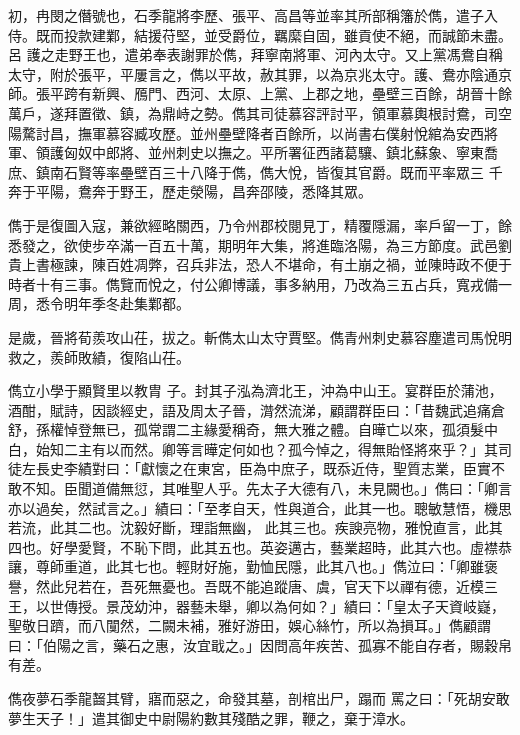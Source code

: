 \begin{pinyinscope}
 初，冉閔之僭號也，石季龍將李歷、張平、高昌等並率其所部稱籓於儁，遣子入侍。既而投款建鄴，結援苻堅，並受爵位，羈縻自固，雖貢使不絕，而誠節未盡。呂
 護之走野王也，遣弟奉表謝罪於儁，拜寧南將軍、河內太守。又上黨馮鴦自稱太守，附於張平，平屢言之，儁以平故，赦其罪，以為京兆太守。護、鴦亦陰通京師。張平跨有新興、鴈門、西河、太原、上黨、上郡之地，壘壁三百餘，胡晉十餘萬戶，遂拜置徵、鎮，為鼎峙之勢。儁其司徒慕容評討平，領軍慕輿根討鴦，司空陽騖討昌，撫軍慕容臧攻歷。並州壘壁降者百餘所，以尚書右僕射悅綰為安西將軍、領護匈奴中郎將、並州刺史以撫之。平所署征西諸葛驤、鎮北蘇象、寧東喬庶、鎮南石賢等率壘壁百三十八降于儁，儁大悅，皆復其官爵。既而平率眾三
 千奔于平陽，鴦奔于野王，歷走滎陽，昌奔邵陵，悉降其眾。



 儁于是復圖入寇，兼欲經略關西，乃令州郡校閱見丁，精覆隱漏，率戶留一丁，餘悉發之，欲使步卒滿一百五十萬，期明年大集，將進臨洛陽，為三方節度。武邑劉貴上書極諫，陳百姓凋弊，召兵非法，恐人不堪命，有土崩之禍，並陳時政不便于時者十有三事。儁覽而悅之，付公卿博議，事多納用，乃改為三五占兵，寬戎備一周，悉令明年季冬赴集鄴都。



 是歲，晉將荀羨攻山茌，拔之。斬儁太山太守賈堅。儁青州刺史慕容塵遣司馬悅明救之，羨師敗績，復陷山茌。



 儁立小學于顯賢里以教胄
 子。封其子泓為濟北王，沖為中山王。宴群臣於蒲池，酒酣，賦詩，因談經史，語及周太子晉，潸然流涕，顧謂群臣曰：「昔魏武追痛倉舒，孫權悼登無已，孤常謂二主緣愛稱奇，無大雅之體。自曄亡以來，孤須髮中白，始知二主有以而然。卿等言曄定何如也？孤今悼之，得無貽怪將來乎？」其司徒左長史李績對曰：「獻懷之在東宮，臣為中庶子，既忝近侍，聖質志業，臣實不敢不知。臣聞道備無愆，其唯聖人乎。先太子大德有八，未見闕也。」儁曰：「卿言亦以過矣，然試言之。」績曰：「至孝自天，性與道合，此其一也。聰敏慧悟，機思若流，此其二也。沈毅好斷，理詣無幽，
 此其三也。疾諛亮物，雅悅直言，此其四也。好學愛賢，不恥下問，此其五也。英姿邁古，藝業超時，此其六也。虛襟恭讓，尊師重道，此其七也。輕財好施，勤恤民隱，此其八也。」儁泣曰：「卿雖褒譽，然此兒若在，吾死無憂也。吾既不能追蹤唐、虞，官天下以禪有德，近模三王，以世傳授。景茂幼沖，器藝未舉，卿以為何如？」績曰：「皇太子天資岐嶷，聖敬日躋，而八闃然，二闕未補，雅好游田，娛心絲竹，所以為損耳。」儁顧謂曰：「伯陽之言，藥石之惠，汝宜戢之。」因問高年疾苦、孤寡不能自存者，賜穀帛有差。



 儁夜夢石季龍齧其臂，寤而惡之，命發其墓，剖棺出尸，蹋而
 罵之曰：「死胡安敢夢生天子！」遣其御史中尉陽約數其殘酷之罪，鞭之，棄于漳水。




\end{pinyinscope}
